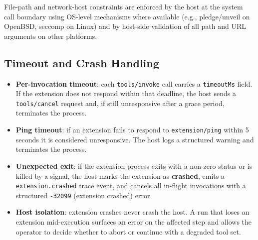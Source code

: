 File-path and network-host constraints are enforced by the host at the system
call boundary using OS-level mechanisms where available (e.g., pledge/unveil on
OpenBSD, seccomp on Linux) and by host-side validation of all path and URL
arguments on other platforms.

\subsection{Timeout and Crash Handling}
\label{sec:ext-crash}

\begin{itemize}
  \item \textbf{Per-invocation timeout}: each \texttt{tools/invoke} call
        carries a \texttt{timeoutMs} field.  If the extension does not respond
        within that deadline, the host sends a \texttt{tools/cancel} request
        and, if still unresponsive after a grace period, terminates the process.
  \item \textbf{Ping timeout}: if an extension fails to respond to
        \texttt{extension/ping} within 5 seconds it is considered unresponsive.
        The host logs a structured warning and terminates the process.
  \item \textbf{Unexpected exit}: if the extension process exits with a
        non-zero status or is killed by a signal, the host marks the extension
        as \textbf{crashed}, emits a \texttt{extension.crashed} trace event,
        and cancels all in-flight invocations with a structured
        \texttt{-32099} (extension crashed) error.
  \item \textbf{Host isolation}: extension crashes never crash the host.  A
        run that loses an extension mid-execution surfaces an error on the
        affected step and allows the operator to decide whether to abort or
        continue with a degraded tool set.
\end{itemize}
